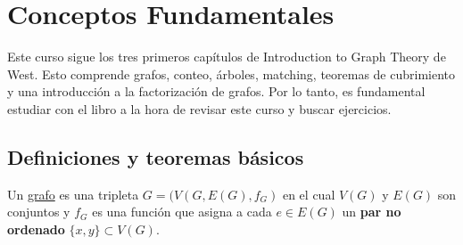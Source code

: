\section{Conceptos Fundamentales}

Este curso sigue los tres primeros capítulos de Introduction to Graph Theory de West. Esto comprende grafos, conteo, árboles, matching, teoremas de cubrimiento y una introducción a la factorización de grafos. Por lo tanto, es fundamental estudiar con el libro a la hora de revisar este curso y buscar ejercicios.

\subsection{Definiciones y teoremas básicos}

\begin{defn}
    Un \ul{grafo} es una tripleta $G = (V(G, E(G), f_G)$ en el cual $V(G)$ y $E(G)$ son conjuntos y $f_G$ es una función que asigna a cada $e \in E(G)$ un \textbf{par no ordenado} $\{x,y\} \subset V(G)$.
\end{defn}

